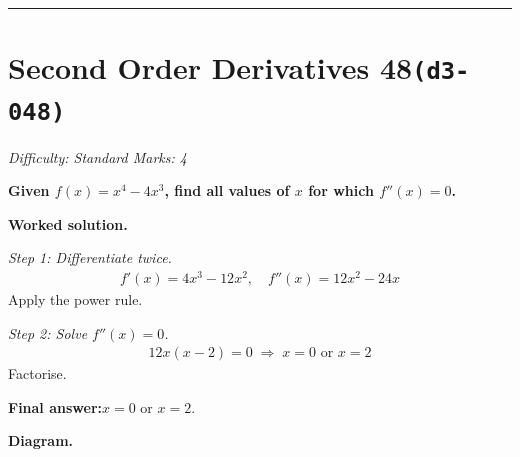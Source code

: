 \documentclass[11pt]{article}
\newcommand{\question}[1]{\par\medskip\noindent\textbf{#1}\par}
\begin{document}
\medskip\hrule

\section*{Second Order Derivatives 48\quad\small\texttt{(d3-048)}}
\textit{Difficulty: Standard \quad\textbar\quad Marks: 4}

\question{Given \( f(x) = x^4 - 4x^3 \), find all values of \( x \) for which \( f''(x) = 0 \).}

\textbf{Worked solution.}

\textit{Step 1: Differentiate twice.}
\[\begin{gathered}
f'(x) = 4x^3 - 12x^2, \quad f''(x) = 12x^2 - 24x
\end{gathered}\]
Apply the power rule.

\textit{Step 2: Solve \( f''(x) = 0 \).}
\[\begin{gathered}
12x(x - 2) = 0 \;\Rightarrow\; x = 0 \text{ or } x = 2
\end{gathered}\]
Factorise.

\begin{answerbox}
\textbf{Final answer:}\quad \(\displaystyle  x = 0 \) or \(\displaystyle  x = 2 \).
\end{answerbox}
\textbf{Diagram.}
\end{document}
